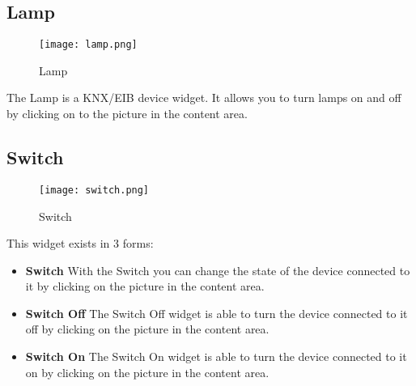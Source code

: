 \subsection{Lamp}
  \begin{figure}[h]
  \centering
  \texttt{[image: lamp.png]}
  \caption{Lamp}
  \label{fig:lamp}
  \end{figure}

    The Lamp is a KNX/EIB device widget. It allows you to turn lamps on and off by clicking on to the picture in the content area.
    \clearpage
\subsection{Switch}
  \begin{figure}[h]
  \centering
  \texttt{[image: switch.png]}
  \caption{Switch}
  \label{fig:switch}
  \end{figure}

    This widget exists in 3 forms:
    \begin{itemize}
        \item \textbf{Switch}
            With the Switch you can change the state of the device connected to it by clicking on the picture in the content area.
        \item \textbf{Switch Off}
            The Switch Off widget is able to turn the device connected to it off by clicking on the picture in the content area.
        \item \textbf{Switch On}
            The Switch On widget is able to turn the device connected to it on by clicking on the picture in the content area.
    \end{itemize}